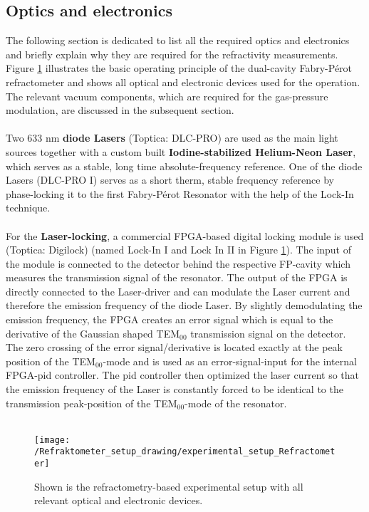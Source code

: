 \subsection{Optics and electronics}
\label{sec:refractometer_setup}
The following section is dedicated to list all the required optics and electronics and briefly explain why they are required for the refractivity measurements. Figure \ref{fig:experimental_setup_Refractometer} illustrates the basic operating principle of the dual-cavity Fabry-Pérot refractometer and shows all optical and electronic devices used for the operation. The relevant vacuum components, which are required for the gas-pressure modulation, are discussed in the subsequent section. \\\\
\noindent
Two 633 nm \textbf{diode Lasers} (Toptica: DLC-PRO)  are used as the main light sources together with a custom built \textbf{Iodine-stabilized Helium-Neon Laser}, which serves as a stable, long time absolute-frequency reference. One of the diode Lasers (DLC-PRO I) serves as a short therm, stable frequency reference by phase-locking it to the first Fabry-Pérot Resonator with the help of the Lock-In technique. \\\\
\noindent
For the \textbf{Laser-locking}, a commercial FPGA-based digital locking module is used (Toptica: Digilock) (named Lock-In I and Lock In II in Figure \ref{fig:experimental_setup_Refractometer}). The input of the module is connected to the detector behind the respective FP-cavity which measures the transmission signal of the resonator. The output of the FPGA is directly connected to the Laser-driver and can modulate the Laser current and therefore the emission frequency of the diode Laser. By slightly demodulating the emission frequency, the FPGA creates an error signal which is equal to the derivative of the Gaussian shaped TEM$_{00}$ transmission signal on the detector. The zero crossing of the error signal/derivative is located exactly at the peak position of the TEM$_{00}$-mode and is used as an error-signal-input for the internal FPGA-pid controller. The pid controller then optimized the laser current so that the emission frequency of the Laser is constantly forced to be identical to the transmission peak-position of the TEM$_{00}$-mode of the resonator. \\\\
\noindent
\begin{figure}[H]
	\centering
	\texttt{[image: /Refraktometer\_setup\_drawing/experimental\_setup\_Refractometer]}
	\caption{Shown is the refractometry-based experimental setup with all relevant optical and electronic devices.}
	\label{fig:experimental_setup_Refractometer}
\end{figure}
